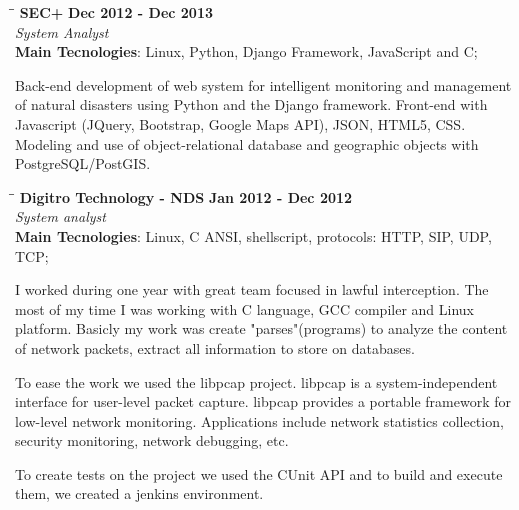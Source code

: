 \documentclass[margin]{res}
\begin{document}
\begin{resume}
\vspace{-0.1in}
   \begin{tabbing}
   \hspace{2.3in}\= \hspace{1.7in}\= \kill %
    \textbf{SEC+}    \>\>\textbf{Dec 2012 - Dec 2013}\\
    \textit{System Analyst}\\        
    \textbf{Main Tecnologies}: Linux, Python, Django Framework, JavaScript and C;
   \end{tabbing}\vspace{-20pt}      %
    \vspace{2mm}
     Back-end development of web system for intelligent monitoring and management of natural disasters
     using Python and the Django framework. Front-end with Javascript (JQuery, Bootstrap, Google Maps API),
     JSON, HTML5, CSS. Modeling and use of object-relational database and geographic objects with
     PostgreSQL/PostGIS.

   \begin{tabbing}
   \hspace{2.3in}\= \hspace{1.7in}\= \kill %
    \textbf{Digitro Technology - NDS}    \>\>\textbf{Jan 2012 - Dec 2012}\\
    \textit{System analyst}\\   
    \textbf{Main Tecnologies}: Linux, C ANSI, shellscript, protocols: HTTP, SIP, UDP, TCP;
   \end{tabbing}\vspace{-20pt}      %
    \vspace{2mm}
    I worked during one year with great team focused in lawful interception. The most of my time I was
    working with C language, GCC compiler and Linux platform. Basicly my work was create "parses"(programs)
    to analyze the content of network packets, extract all information to store on databases. 

    To ease the work we used the libpcap project. libpcap is a system-independent interface for user-level
    packet capture. libpcap provides a portable framework for low-level network monitoring. Applications
    include network statistics collection, security monitoring, network debugging, etc.

    To create tests on the project we used the CUnit API and to build and execute them, we created a jenkins environment.


\end{resume}
\end{document}
